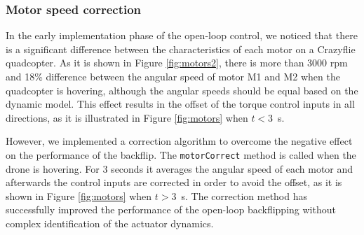\subsubsection{Motor speed correction}
In the early implementation phase of the open-loop control, we noticed that there is a significant difference between the characteristics of each motor on a Crazyflie quadcopter. As it is shown in Figure \ref{fig:motors2}, there is more than 3000 rpm and 18\% difference between the angular speed of motor M1 and M2 when the quadcopter is hovering, although the angular speeds should be equal based on the dynamic model. This effect results in the offset of the torque control inputs in all directions, as it is illustrated in Figure \ref{fig:motors} when $t<3$~s.

However, we implemented a correction algorithm to overcome the negative effect on the performance of the backflip. The \verb+motorCorrect+ method is called when the drone is hovering. For 3 seconds it averages the angular speed of each motor and afterwards the control inputs are corrected in order to avoid the offset, as it is shown in Figure  \ref{fig:motors} when $t>3$~s. The correction method has successfully improved the performance of the open-loop backflipping without complex identification of the actuator dynamics.

